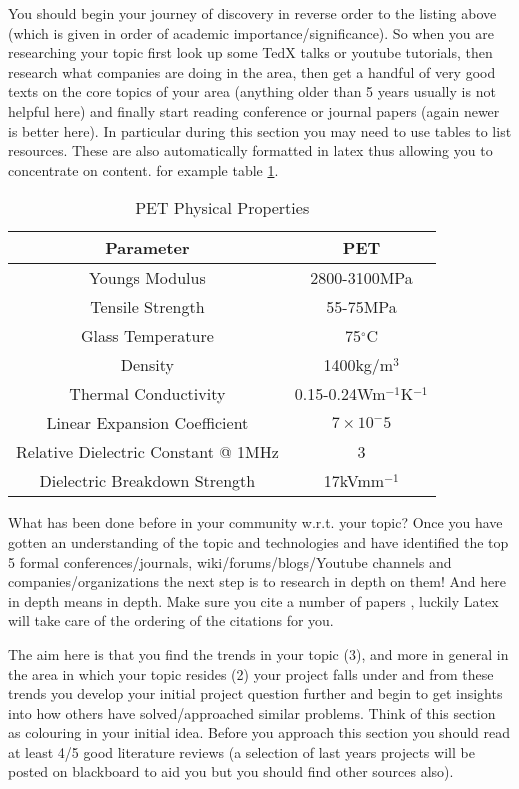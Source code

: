 You should begin your journey of discovery in reverse order to the listing above (which is given in order of academic importance/significance). So when you are researching your topic first look up some TedX talks or youtube tutorials, then research what companies are doing in the area, then get a handful of very good texts on the core topics of your area (anything older than 5 years usually is not helpful here) and finally start reading conference or journal papers (again newer is better here). In particular during this section you may need to use tables to list resources. These are also automatically formatted in latex thus allowing you to concentrate on content. for example table \ref{tab:Mylar}.

\begin{table}[ht]
	\centering
		\begin{tabular}{ c  c  }
		\hline
		\hline
		Parameter & PET \\
		\hline
		Youngs Modulus & 2800-3100MPa \\
		Tensile Strength & 55-75MPa \\
		Glass Temperature & 75$^\circ$C \\
		Density & 1400kg/m$^3$ \\
		Thermal Conductivity & 0.15-0.24Wm$^{-1}$K$^{-1}$ \\
		Linear Expansion Coefficient & $7\times10^-5$ \\
		Relative Dielectric Constant @ 1MHz & 3\\
		Dielectric Breakdown Strength & 17kVmm$^{-1}$\\
		\end{tabular}
	\caption{PET Physical Properties}
	\label{tab:Mylar}
\end{table}

What has been done before in your community w.r.t. your topic? Once you have gotten an understanding of the topic and technologies and have identified the top 5 formal conferences/journals, wiki/forums/blogs/Youtube channels and companies/organizations the next step is to research in depth on them! And here in depth means in depth. Make sure you cite\cite{Reference1} a number of papers \cite{Reference3}, luckily Latex will take care of the ordering of the citations \cite{Reference2} for you.

The aim here is that you find the trends in your topic (3), and more in general in the area in which your topic resides (2) your project falls under and from these trends you develop your initial project question further and begin to get insights into how others have solved/approached similar problems. Think of this section as colouring in your initial idea. Before you approach this section you should read at least 4/5 good literature reviews (a selection of last years projects will be posted on blackboard to aid you but you should find other sources also).

